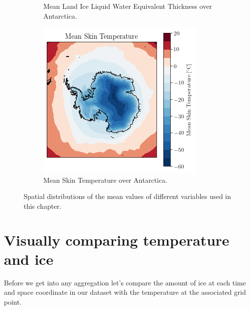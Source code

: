 \documentclass[../main.tex]{subfiles}
\begin{document}
\begin{figure}[H]
\begin{subfigure}[h!]{0.49\textwidth}
\caption{Mean Land Ice Liquid Water Equivalent Thickness over Antarctica.}
\end{subfigure}
\begin{subfigure}[h!]{0.49\textwidth}
\includegraphics[width=\textwidth]{images/week8/lres/mean_skt_distribution}
\caption{Mean Skin Temperature over Antarctica.}
\end{subfigure}
\caption{Spatial distributions of the mean values of different variables used in this chapter.}
\label{fig:mean_distributions}
\end{figure}

\section{Visually comparing temperature and ice}
Before we get into any aggregation let's compare the amount of ice at each time and space coordinate in our dataset with the temperature at the associated grid point. 
\end{document}
